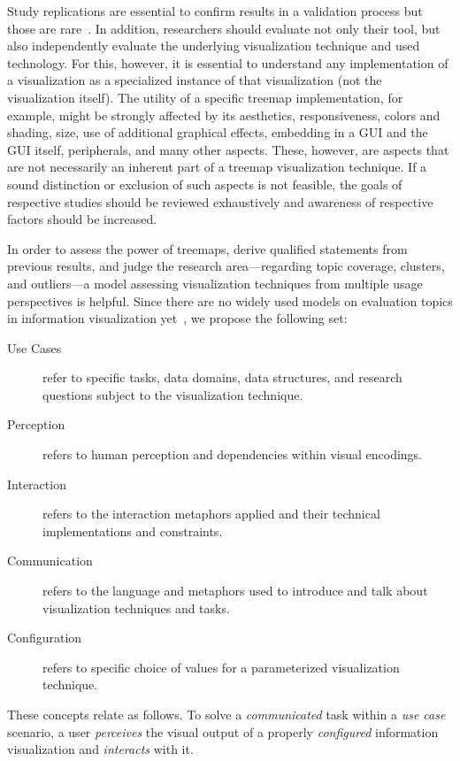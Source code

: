 \documentclass[sigconf,
natbib=true]{acmart}
\begin{document}
Study replications are essential to confirm results in a validation process but those are rare~\cite{isenberg2013-review,ware2013-infovis}.
In addition, researchers should evaluate not only their tool, but also independently evaluate the underlying visualization technique and used technology.
For this, however, it is essential to understand any implementation of a visualization as a specialized instance of that visualization (not the visualization itself).
The utility of a specific treemap implementation, for example, might be strongly affected by its aesthetics, responsiveness, colors and shading, size, use of additional graphical effects, embedding in a GUI and the GUI itself, peripherals, and many other aspects.
These, however, are aspects that are not necessarily an inherent part of a treemap visualization technique.
If a sound distinction or exclusion of such aspects is not feasible, the goals of respective studies should be reviewed exhaustively and awareness of respective factors should be increased.
\par
In order to assess the power of treemaps, derive qualified statements from previous results, and judge the research area---regarding topic coverage, clusters, and outliers---a model assessing visualization techniques from multiple usage perspectives is helpful.
Since there are no widely used models on evaluation topics in information visualization yet~\cite{zuk2006-heuristics}, we propose the following set:
\begin{description}
    \item[Use Cases] refer to specific tasks, data domains, data structures, and research questions subject to the visualization technique.
    \item[Perception] refers to human perception and dependencies within visual encodings.
    \item[Interaction] refers to the interaction metaphors applied and their technical implementations and constraints.
    \item[Communication] refers to the language and metaphors used to introduce and talk about visualization techniques and tasks.
    \item[Configuration] refers to specific choice of values for a parameterized visualization technique.
\end{description}
These concepts relate as follows. To solve a \emph{communicated} task within a \emph{use case} scenario, a user \emph{perceives} the visual output of a properly \emph{configured} information visualization and \emph{interacts} with it.
\end{document}
